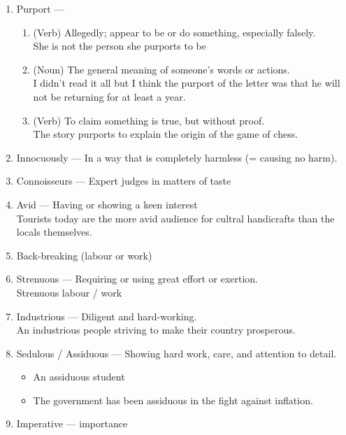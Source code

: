 \documentclass[oneside]{book}
\begin{document}
\begin{enumerate}
        \item Purport --- \begin{enumerate}
            \item (Verb) Allegedly; appear to be or do something, especially falsely.\\
            \footnotesize She is not the person she purports to be \normalsize
            \item (Noun) The general meaning of someone's words or actions.\\ \footnotesize I didn't read it all but I think the purport of the letter was that he will not be returning for at least a year. \normalsize
            \item (Verb) To claim something is true, but without proof.\\
            \footnotesize The story purports to explain the origin of the game of chess. \normalsize
        \end{enumerate}
        \item Innocuously --- In a way that is completely harmless (= causing no harm).
        \item Connoisseurs --- Expert judges in matters of taste 
        \item Avid --- Having or showing a keen interest\\
        \footnotesize Tourists today are the more avid audience for cultral handicrafts than the locals themselves. \normalsize
        \item Back-breaking (labour or work)
        \item Strenuous --- Requiring or using great effort or exertion.\\
        \footnotesize Strenuous labour / work \normalsize
        \item Industrious --- Diligent and hard-working.\\
        \footnotesize An industrious people striving to make their country prosperous. \normalsize
        \item Sedulous / Assiduous --- Showing hard work, care, and attention to detail.
        \footnotesize \begin{itemize}
            \item An assiduous student
            \item The government has been assiduous in the fight against inflation.
        \end{itemize} \normalsize
        \item Imperative --- importance\\

\end{enumerate}
\end{document}
